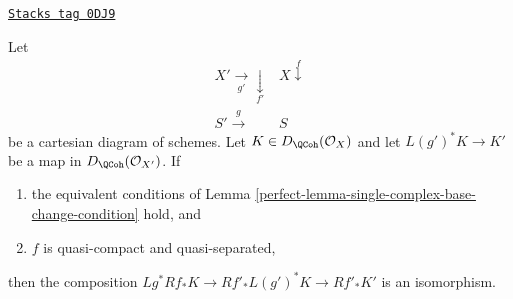 \begin{lemma}
\label{perfect-lemma-single-complex-base-change}
\href{https://stacks.math.columbia.edu/tag/0DJ9}{\texttt{Stacks tag 0DJ9}}

Let
$$
\begin{array}{cc}X' \underset{g'}{\longrightarrow}\underset{f'}{\downarrow} & X \overset{f}{\downarrow} \\ S' \overset{g}{\longrightarrow} & S\end{array}
$$
be a cartesian diagram of schemes. Let $K \in D_\QCoh(\mathcal{O}_X)$
and let $L(g')^*K \to K'$ be a map in $D_\QCoh(\mathcal{O}_{X'})$.
If
\begin{enumerate}
\item the equivalent conditions of
Lemma \ref{perfect-lemma-single-complex-base-change-condition} hold, and
\item $f$ is quasi-compact and quasi-separated,
\end{enumerate}
then the composition $Lg^*Rf_*K \to Rf'_*L(g')^*K \to Rf'_*K'$
is an isomorphism.
\end{lemma}

